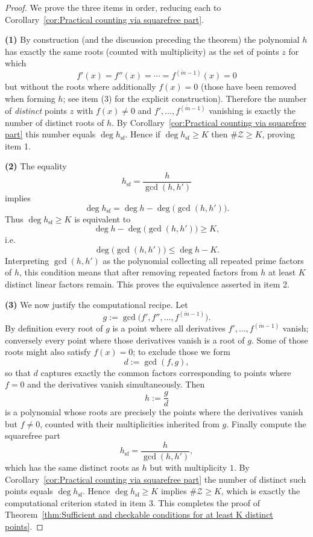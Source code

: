 \documentclass[10pt,a4paper]{amsart}
\begin{document}
\begin{proof}

We prove the three items in order, reducing each to Corollary~\ref{cor:Practical counting via squarefree part}.

\medskip\noindent\textbf{(1)} By construction (and the discussion preceding the theorem) the polynomial \(h\) has exactly the same roots (counted with multiplicity) as the set of points \(z\) for which
\[
f'(x)=f''(x)=\cdots=f^{(\acute{m}-1)}(x)=0
\]
but without the roots where additionally \(f(x)=0\) (those have been removed when forming \(h\); see item (3) for the explicit construction). Therefore the number of \emph{distinct} points \(z\) with \(f(x)\neq0\) and \(f',\dots,f^{(\acute{m}-1)}\) vanishing is exactly the number of distinct roots of \(h\). By Corollary~\ref{cor:Practical counting via squarefree part} this number equals \(\deg h_{\mathrm{sf}}\). Hence if \(\deg h_{\mathrm{sf}}\ge K\) then \(\#\mathcal Z\ge K\), proving item 1.

\medskip\noindent\textbf{(2)} The equality
\[
h_{\mathrm{sf}}=\frac{h}{\gcd(h,h')}
\]
implies
\[
\deg h_{\mathrm{sf}}=\deg h-\deg\big(\gcd(h,h')\big).
\]
Thus \(\deg h_{\mathrm{sf}}\ge K\) is equivalent to
\[
\deg h-\deg\big(\gcd(h,h')\big)\ge K,
\]
i.e.
\[
\deg\big(\gcd(h,h')\big)\le \deg h-K.
\]
Interpreting \(\gcd(h,h')\) as the polynomial collecting all repeated prime factors of \(h\), this condition means that after removing repeated factors from \(h\) at least \(K\) distinct linear factors remain. This proves the equivalence asserted in item 2.

\medskip\noindent\textbf{(3)} We now justify the computational recipe. Let
\[
g:=\gcd\big(f',f'',\dots,f^{(\acute{m}-1)}\big).
\]
By definition every root of \(g\) is a point where all derivatives \(f',\dots,f^{(\acute{m}-1)}\) vanish; conversely every point where those derivatives vanish is a root of \(g\). Some of those roots might also satisfy \(f(x)=0\); to exclude those we form
\[
d:=\gcd(f,g),
\]
so that \(d\) captures exactly the common factors corresponding to points where \(f=0\) and the derivatives vanish simultaneously. Then
\[
h:=\frac{g}{d}
\]
is a polynomial whose roots are precisely the points where the derivatives vanish but \(f\neq0\), counted with their multiplicities inherited from \(g\). Finally compute the squarefree part
\[
h_{\mathrm{sf}}=\frac{h}{\gcd(h,h')},
\]
which has the same distinct roots as \(h\) but with multiplicity \(1\). By Corollary~\ref{cor:Practical counting via squarefree part} the number of distinct such points equals \(\deg h_{\mathrm{sf}}\). Hence \(\deg h_{\mathrm{sf}}\ge K\) implies \(\#\mathcal Z\ge K\), which is exactly the computational criterion stated in item 3. This completes the proof of Theorem~\ref{thm:Sufficient and checkable conditions for at least K distinct points}.
%
\end{proof}
\end{document}
